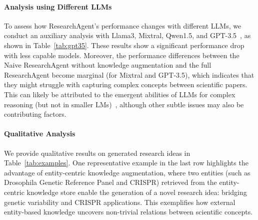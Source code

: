 \paragraph{Analysis using Different LLMs}
To assess how ResearchAgent's performance changes with different LLMs, we conduct an auxiliary analysis with Llama3, Mixtral, Qwen1.5, and GPT-3.5~\cite{Qwen, Mixtral}, as shown in Table~\ref{tab:gpt35}. These results show a significant performance drop with less capable models. Moreover, the performance differences between the Naive ResearchAgent without knowledge augmentation and the full ResearchAgent become marginal (for Mixtral and GPT-3.5), which indicates that they might struggle with capturing complex concepts between scientific papers. This can likely be attributed to the emergent abilities of LLMs for complex reasoning (but not in smaller LMs)~\cite{Wei2022EmergentAO}, although other subtle issues may also be contributing factors.

\paragraph{Qualitative Analysis}
We provide qualitative results on generated research ideas in Table~\ref{tab:examples}. One representative example in the last row highlights the advantage of entity-centric knowledge augmentation, where two entities (such as Drosophila Genetic Reference Panel and CRISPR) retrieved from the entity-centric knowledge store enable the generation of a novel research idea: bridging genetic variability and CRISPR applications. This exemplifies how external entity-based knowledge uncovers non-trivial relations between scientific concepts.


